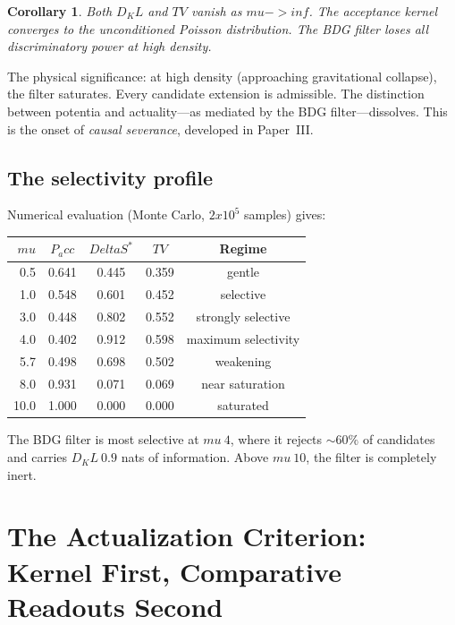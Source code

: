 \documentclass[11pt]{article}
\def\Delta{Delta}%
\def\mu{mu}%
\def\mathrm#1{#1}%
\def\times{x}%
\def\approx{~}%
\def\to{->}%
\def\infty{inf}%
\def\Pacc{P_acc}%
\def\Dkl{D_KL}%
\def\TV{TV}%
\newtheorem{corollary}{Corollary}
\newcommand{\Pacc}{P_{\mathrm{acc}}}
\newcommand{\Dkl}{D_{\mathrm{KL}}}
\newcommand{\TV}{\mathrm{TV}}
\begin{document}
\begin{corollary}
Both $\Dkl$ and $\TV$ vanish as $\mu\to\infty$. The acceptance kernel converges to the unconditioned Poisson distribution. The BDG filter loses all discriminatory power at high density.
\end{corollary}

The physical significance: at high density (approaching gravitational collapse), the filter saturates. Every candidate extension is admissible. The distinction between potentia and actuality---as mediated by the BDG filter---dissolves. This is the onset of \emph{causal severance}, developed in Paper~III.

\subsection{The selectivity profile}

Numerical evaluation (Monte Carlo, $2\times 10^5$ samples) gives:

\begin{center}
\begin{tabular}{rcccc}
\toprule
$\mu$ & $\Pacc$ & $\Delta S^*$ & $\TV$ & Regime \\
\midrule
0.5 & 0.641 & 0.445 & 0.359 & gentle \\
1.0 & 0.548 & 0.601 & 0.452 & selective \\
3.0 & 0.448 & 0.802 & 0.552 & strongly selective \\
4.0 & 0.402 & 0.912 & 0.598 & maximum selectivity \\
5.7 & 0.498 & 0.698 & 0.502 & weakening \\
8.0 & 0.931 & 0.071 & 0.069 & near saturation \\
10.0 & 1.000 & 0.000 & 0.000 & saturated \\
\bottomrule
\end{tabular}
\end{center}

The BDG filter is most selective at $\mu\approx 4$, where it rejects $\sim 60\%$ of candidates and carries $\Dkl\approx 0.9$ nats of information. Above $\mu\approx 10$, the filter is completely inert.

\section{The Actualization Criterion: Kernel First, Comparative Readouts Second}
\label{sec:criterion}
\end{document}
